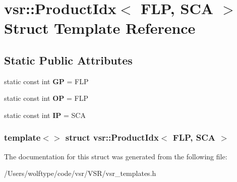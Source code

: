 \hypertarget{structvsr_1_1_product_idx_3_01_f_l_p_00_01_s_c_a_01_4}{\section{vsr\-:\-:Product\-Idx$<$ F\-L\-P, S\-C\-A $>$ Struct Template Reference}
\label{structvsr_1_1_product_idx_3_01_f_l_p_00_01_s_c_a_01_4}
}
\subsection*{Static Public Attributes}
\begin{DoxyCompactItemize}
\item 
\hypertarget{structvsr_1_1_product_idx_3_01_f_l_p_00_01_s_c_a_01_4_a586919dc69074613706fa1e2af7a426c}{static const int {\bfseries G\-P} = F\-L\-P}\label{structvsr_1_1_product_idx_3_01_f_l_p_00_01_s_c_a_01_4_a586919dc69074613706fa1e2af7a426c}

\item 
\hypertarget{structvsr_1_1_product_idx_3_01_f_l_p_00_01_s_c_a_01_4_a81be78a3247b7dce526d78b094347ab1}{static const int {\bfseries O\-P} = F\-L\-P}\label{structvsr_1_1_product_idx_3_01_f_l_p_00_01_s_c_a_01_4_a81be78a3247b7dce526d78b094347ab1}

\item 
\hypertarget{structvsr_1_1_product_idx_3_01_f_l_p_00_01_s_c_a_01_4_ae408dd91da815385a856d0ce8c63b944}{static const int {\bfseries I\-P} = S\-C\-A}\label{structvsr_1_1_product_idx_3_01_f_l_p_00_01_s_c_a_01_4_ae408dd91da815385a856d0ce8c63b944}

\end{DoxyCompactItemize}
\subsubsection*{template$<$$>$ struct vsr\-::\-Product\-Idx$<$ F\-L\-P, S\-C\-A $>$}



The documentation for this struct was generated from the following file\-:\begin{DoxyCompactItemize}
\item 
/\-Users/wolftype/code/vsr/\-V\-S\-R/vsr\-\_\-templates.\-h\end{DoxyCompactItemize}
